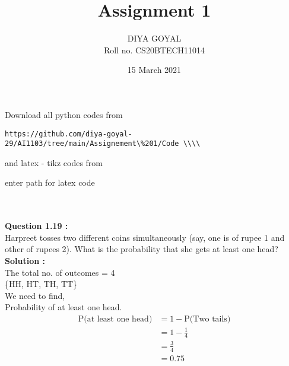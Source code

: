 \documentclass[journal,12pt,twocolumn]{IEEEtran}
\title{Assignment 1}
\author{DIYA GOYAL\\
Roll no. CS20BTECH11014}
\date{15 March 2021}
\begin{document}
\maketitle
\large Download all python codes from\\
\begin{lstlisting}
https://github.com/diya-goyal-29/AI1103/tree/main/Assignement\%201/Code \\\\
\end{lstlisting}
\large and latex - tikz codes from \\
\begin{tcolorbox}
enter path for latex code\\
\end{tcolorbox}
\\ \\
\large\textbf{Question 1.19 :} \\
Harpreet tosses two different coins simultaneously (say, one is of rupee 1 and other of rupees 2). What is the probability that she gets at least one head? \\
\large\textbf{Solution :}\\
The total no. of outcomes = 4\\ 
\{HH, HT, TH, TT\}\\
We need to find,\\
Probability of at least one head.\\
\begin{equation}
    \begin{split}
        \text{P(at least one head)} & = 1 - \text{P(Two tails)}\\ 
        & = 1 - \frac{1}{4}\\
        & = \frac{3}{4}\\
        & = 0.75\\
    \end{split}
\end{equation}
\end{document}
